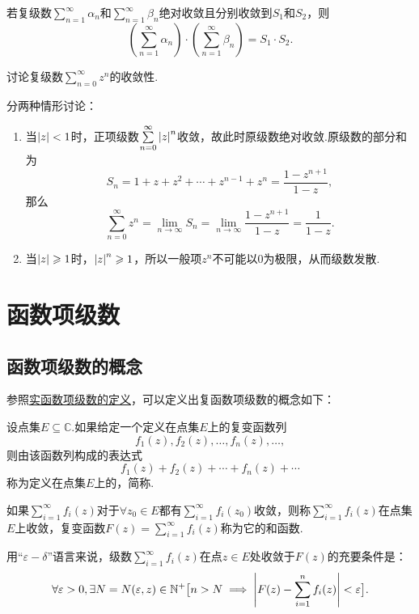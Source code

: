 \begin{theorem}
若复级数\(\sum\limits_{n=1}^{\infty}\alpha_n\)和\(\sum\limits_{n=1}^{\infty}\beta_n\)绝对收敛且分别收敛到\(S_1\)和\(S_2\)，则\[
\left( \sum\limits_{n=1}^{\infty}\alpha_n \right) \cdot \left( \sum\limits_{n=1}^{\infty}\beta_n \right) = S_1 \cdot S_2.
\]
\end{theorem}

\begin{example}[复等比级数]\label{example:解析级数的级数表示.复等比级数}
讨论复级数\(\sum\limits_{n=0}^{\infty} z^n\)的收敛性.
\begin{solution}
分两种情形讨论：\begin{enumerate}
\item 当\(\abs{z} < 1\)时，正项级数\(\sum\limits_{n=0}^{\infty} \abs{z}^n\)收敛，故此时原级数绝对收敛.原级数的部分和为\[
S_n = 1 + z + z^2 + \dotsb + z^{n-1} + z^n = \frac{1-z^{n+1}}{1-z},
\]那么\[
\sum\limits_{n=0}^{\infty} z^n = \lim\limits_{n\to\infty} S_n = \lim\limits_{n\to\infty} \frac{1-z^{n+1}}{1-z} = \frac{1}{1-z}.
\]

\item 当\(\abs{z} \geqslant 1\)时，\(\abs{z}^n \geqslant 1\)，所以一般项\(z^n\)不可能以\(0\)为极限，从而级数发散.
\end{enumerate}
\end{solution}
\end{example}

\section{函数项级数}
\subsection{函数项级数的概念}
参照\hyperref[definition:无穷级数.实函数项级数的概念]{实函数项级数的定义}，可以定义出复函数项级数的概念如下：
\begin{definition}\label{definition:解析函数的级数表示.收敛级数}
设点集\(E \subseteq \mathbb{C}\).如果给定一个定义在点集\(E\)上的复变函数列\[
f_1(z), f_2(z), \dotsc, f_n(z), \dotsc,
\]则由该函数列构成的表达式\[
f_1(z) + f_2(z) + \dotsb + f_n(z) + \dotsb
\]称为定义在点集\(E\)上的，简称.

如果\(\sum\limits_{i=1}^{\infty} f_i(z)\)对于\(\forall z_0 \in E\)都有\(\sum\limits_{i=1}^{\infty} f_i(z_0)\)收敛，则称\(\sum\limits_{i=1}^{\infty} f_i(z)\)在点集\(E\)上收敛，复变函数\(F(z) = \sum\limits_{i=1}^{\infty} f_i(z)\)称为它的和函数.
\end{definition}
用“\(\varepsilon-\delta\)”语言来说，级数\(\sum\limits_{i=1}^{\infty} f_i(z)\)在点\(z \in E\)处收敛于\(F(z)\)的充要条件是：\[
\forall \varepsilon > 0, \exists N = N(\varepsilon, z) \in \mathbb{N}^+ \bigl[
n > N \implies \abs{F(z) - \sum\limits_{i=1}^n f_i(z)} < \varepsilon
\bigr].
\]

